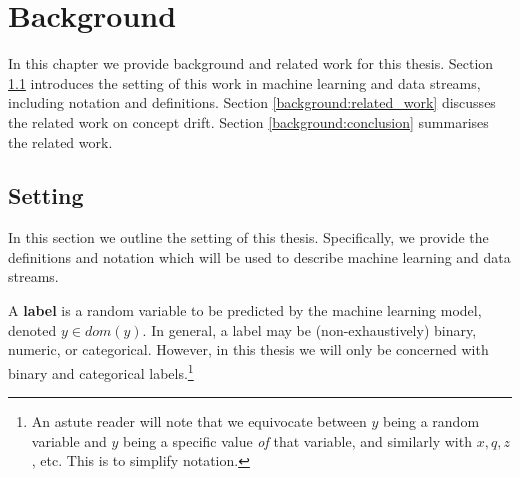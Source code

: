 \chapter{Background} \label{chapt:Background}

In this chapter we provide background and related work for this thesis. Section \ref{background:setting} introduces the setting of this work in machine learning and data streams, including notation and definitions. Section \ref{background:related_work} discusses the related work on concept drift. Section \ref{background:conclusion} summarises the related work.


\section{Setting} \label{background:setting}

In this section we outline the setting of this thesis. Specifically, we provide the definitions and notation which will be used to describe machine learning and data streams.



\newcommand{\id}[1]{\mathds{1}[#1]} %
\newcommand{\x}[1]{x^{(#1)}}
\newcommand{\X}[1]{X^{(#1)}}

A {\bf label} is a random variable to be predicted by the machine learning model, denoted $y\in dom(y)$. In general, a label may be (non-exhaustively) binary, numeric, or categorical. However, in this thesis we will only be concerned with binary and categorical labels.\footnote{An astute reader will note that we equivocate between $y$ being a random variable and $y$ being a specific value {\it of} that variable, and similarly with $x,q,z$, etc. This is to simplify notation.}  

